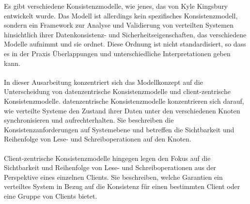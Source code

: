 \documentclass[../vs-script-first-v01.tex]{subfiles}
\begin{document}
Es gibt verschiedene Konsistenzmodelle, wie jenes, das von Kyle Kingsbury entwickelt wurde. Das Modell ist allerdings  kein spezifisches Konsistenzmodell, sondern ein Framework zur Analyse und Validierung von verteilten Systemen hinsichtlich ihrer Datenkonsistenz- und Sicherheitseigenschaften, das verschiedene Modelle aufnimmt und sie ordnet. Diese Ordnung ist nicht standardisiert, so dass es in der Praxis Überlappungen und unterschiedliche Interpretationen geben kann. 
\\\\
In dieser Ausarbeitung konzentriert sich das Modellkonzept auf die Unterscheidung von datenzentrische Konsistenzmodelle und client-zentrische Konsistenzmodelle. datenzentrische Konsistenzmodelle konzentrieren sich darauf, wie verteilte Systeme den Zustand ihrer Daten unter den verschiedenen Knoten synchronisieren und aufrechterhalten. Sie beschreiben die Konsistenzanforderungen auf Systemebene und betreffen die Sichtbarkeit und Reihenfolge von Lese- und Schreiboperationen auf den Knoten.
\\\\
Client-zentrische Konsistenzmodelle hingegen legen den Fokus auf die Sichtbarkeit und Reihenfolge von Lese- und Schreiboperationen aus der Perspektive eines einzelnen Clients. Sie beschreiben, welche Garantien ein verteiltes System in Bezug auf die Konsistenz für einen bestimmten Client oder eine Gruppe von Clients bietet.
\end{document}
